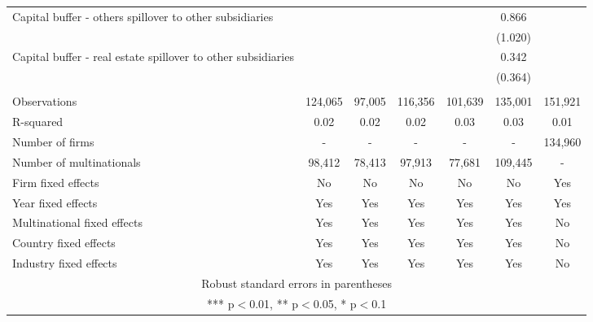 \begin{tabular}{lcccccc}
Capital buffer - others spillover to other subsidiaries &  &  &  &  & 0.866 &  \\
 &  &  &  &  & (1.020) &  \\
Capital buffer - real estate spillover to other subsidiaries &  &  &  &  & 0.342 &  \\
 &  &  &  &  & (0.364) &  \\
 &  &  &  &  &  &  \\
Observations & 124,065 & 97,005 & 116,356 & 101,639 & 135,001 & 151,921 \\
R-squared & 0.02 & 0.02 & 0.02 & 0.03 & 0.03 & 0.01 \\
Number of firms & - & - & - & - & - & 134,960 \\
Number of multinationals & 98,412 & 78,413 & 97,913 & 77,681 & 109,445 & - \\
Firm fixed effects & No & No & No & No & No & Yes \\
Year fixed effects & Yes & Yes & Yes & Yes & Yes & Yes \\
Multinational fixed effects & Yes & Yes & Yes & Yes & Yes & No \\
Country fixed effects & Yes & Yes & Yes & Yes & Yes & No \\
 Industry fixed effects & Yes & Yes & Yes & Yes & Yes & No \\ \hline
\multicolumn{7}{c}{ Robust standard errors in parentheses} \\
\multicolumn{7}{c}{ *** p$<$0.01, ** p$<$0.05, * p$<$0.1} \\
\end{tabular}
